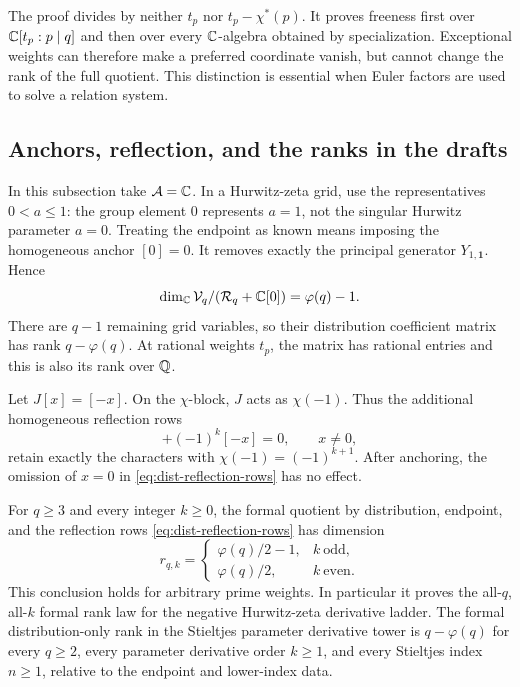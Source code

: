 \begin{remark}
The proof divides by neither \(t_p\) nor \(t_p-\chi^*(p)\).
It proves freeness first over \(\mathbb{C}[t_p:p\mid q]\) and then over
every \(\mathbb{C}\)-algebra obtained by specialization. Exceptional weights
can therefore make a preferred coordinate vanish, but cannot change
the rank of the full quotient. This distinction is essential when
Euler factors are used to solve a relation system.
\end{remark}

\subsection{Anchors, reflection, and the ranks in the drafts}

In this subsection take \(\mathcal A=\mathbb{C}\).
In a Hurwitz-zeta grid, use the representatives \(0<a\leq1\):
the group element \(0\) represents \(a=1\), not the singular
Hurwitz parameter \(a=0\). Treating the endpoint as known means
imposing the homogeneous anchor \([0]=0\). It removes exactly the
principal generator \(Y_{1,\mathbf1}\). Hence
\begin{equation}
 \dim_{\mathbb{C}}\mathcal V_q/(\mathcal R_q+\mathbb{C}[0])=\varphi(q)-1.
 \label{eq:dist-anchor-dimension}
\end{equation}
There are \(q-1\) remaining grid variables, so their distribution
coefficient matrix has rank \(q-\varphi(q)\). At rational weights
\(t_p\), the matrix has rational entries and this is also its rank
over \(\mathbb{Q}\).

Let \(J[x]=[-x]\). On the \(\chi\)-block, \(J\) acts as
\(\chi(-1)\). Thus the additional homogeneous reflection rows
\begin{equation}
 [x]+(-1)^k[-x]=0,\qquad x\ne0,
 \label{eq:dist-reflection-rows}
\end{equation}
retain exactly the characters with
\(\chi(-1)=(-1)^{k+1}\). After anchoring, the omission of \(x=0\)
in \eqref{eq:dist-reflection-rows} has no effect.

\begin{corollary}
\label{cor:dist-all-ranks}
For \(q\geq3\) and every integer \(k\geq0\), the formal quotient
by distribution, endpoint, and the reflection rows
\eqref{eq:dist-reflection-rows} has dimension
\begin{equation}
 r_{q,k}=
 \begin{cases}
 \varphi(q)/2-1,&k\ \text{odd},\\
 \varphi(q)/2,&k\ \text{even}.
 \end{cases}
 \label{eq:dist-parity-dimension}
\end{equation}
This conclusion holds for arbitrary prime weights.
In particular it proves the all-\(q\), all-\(k\) formal rank law
for the negative Hurwitz-zeta derivative ladder.
The formal distribution-only rank in the Stieltjes parameter
derivative tower is \(q-\varphi(q)\) for every \(q\geq2\),
every parameter derivative order \(k\geq1\), and every Stieltjes
index \(n\geq1\), relative to the endpoint and lower-index data.
\end{corollary}

